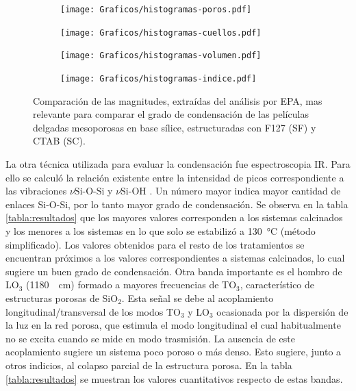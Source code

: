 				   \begin{figure}[ht!]
				 	   	    
				 	   	    \begin{subfigure}[t]{0.5\textwidth}
				        	\texttt{[image: Graficos/histogramas-poros.pdf]}
				       		\end{subfigure}
				         	\begin{subfigure}[t]{0.5\textwidth}
				        	\texttt{[image: Graficos/histogramas-cuellos.pdf]}
				       		\end{subfigure}
				         	 \begin{subfigure}[t]{0.5\textwidth}
				        	\texttt{[image: Graficos/histogramas-volumen.pdf]}
				       		\end{subfigure}
				         	\begin{subfigure}[t]{0.5\textwidth}
				        	\texttt{[image: Graficos/histogramas-indice.pdf]}
				       		\end{subfigure}
				     		\caption[a]{Comparación de las magnitudes, extraídas del análisis por EPA, mas relevante para comparar el grado de condensación de las películas delgadas mesoporosas en base sílice, estructuradas con F127 (SF) y CTAB (SC).}
				     		\label{fig:histogramas}
				     		\end{figure}
		
		\clearpage

		La otra técnica utilizada para evaluar la condensación fue espectroscopia IR. Para ello se calculó la relación existente entre la intensidad de picos correspondiente a las vibraciones $\nu{\text{Si-O-Si}}$ y $\nu{\text{Si-OH}}$ \cite{Pai1986,Innocenzi2003}. Un número mayor indica mayor cantidad de enlaces Si-O-Si, por lo tanto mayor grado de condensación. Se observa en la tabla \ref{tabla:resultados} que los mayores valores corresponden a los sistemas calcinados y los menores a los sistemas en lo que solo se estabilizó a \SI{130}{\celsius} (método simplificado). Los valores obtenidos para el resto de los tratamientos se encuentran próximos a los valores correspondientes a sistemas calcinados, lo cual sugiere un buen grado de condensación.  Otra banda importante es el hombro de LO$_3$ (\SI{1180}{\per\cm}) formado a mayores frecuencias de TO$_3$, característico de estructuras porosas de SiO$_2$. Esta señal se debe al acoplamiento longitudinal/transversal de los modos TO$_3$ y LO$_3$ ocasionada por la dispersión de la luz en la red porosa, que estimula el modo longitudinal el cual habitualmente no se excita cuando se mide en modo trasmisión\cite{Innocenzi2003,Lange1990,Lange1989}. La ausencia de este acoplamiento sugiere un sistema poco poroso o más denso. Esto sugiere, junto a otros indicios, al colapso parcial de la estructura porosa. En la tabla \ref{tabla:resultados} se muestran los valores cuantitativos respecto de estas bandas.	
			

